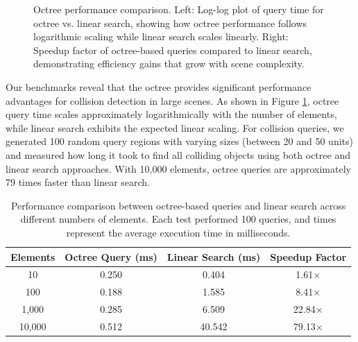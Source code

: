 \documentclass{article}
\begin{document}
\begin{figure}[H]
\begin{minipage}{0.49\textwidth}
    \end{minipage}
    \caption{Octree performance comparison. Left: Log-log plot of query time for octree vs. linear search, showing how octree performance follows logarithmic scaling while linear search scales linearly. Right: Speedup factor of octree-based queries compared to linear search, demonstrating efficiency gains that grow with scene complexity.}
    \label{fig:octree-performance}
\end{figure}

Our benchmarks reveal that the octree provides significant performance
advantages for collision detection in large scenes. As shown in Figure
\ref{fig:octree-performance}, octree query time scales approximately
logarithmically with the number of elements, while linear search exhibits the
expected linear scaling. For collision queries, we generated 100 random query regions with varying sizes (between 20 and 50 units) and measured how long it took to find all colliding objects using both octree and linear search approaches. With 10,000 elements, octree queries are approximately
79 times faster than linear search.

\begin{table}[H]
    \centering
    \begin{tabular}{|c|c|c|c|}
        \hline
        \textbf{Elements} & \textbf{Octree Query (ms)} & \textbf{Linear Search (ms)} & \textbf{Speedup Factor} \\ \hline
        10 & 0.250 & 0.404 & 1.61× \\ \hline
        100 & 0.188 & 1.585 & 8.41× \\ \hline
        1,000 & 0.285 & 6.509 & 22.84× \\ \hline
        10,000 & 0.512 & 40.542 & 79.13× \\ \hline
    \end{tabular}
    \caption{Performance comparison between octree-based queries and linear search across different numbers of elements. Each test performed 100 queries, and times represent the average execution time in milliseconds.}
    \label{tab:octree-performance}
\end{table}
\end{document}
